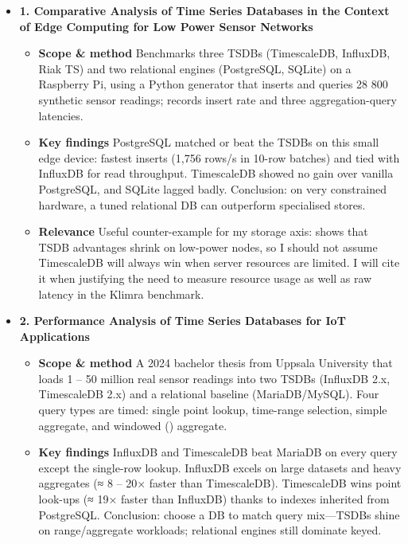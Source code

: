 \documentclass[11pt]{article}
\begin{document}
\begin{itemize}
    \item[] \textbf{1. Comparative Analysis of Time Series Databases in the Context of Edge Computing for Low Power Sensor Networks}
    \begin{itemize}
      \item[] \textbf{Scope \& method}  Benchmarks three TSDBs (TimescaleDB, InfluxDB, Riak TS) and two relational engines (PostgreSQL, SQLite) on a Raspberry Pi, using a Python generator that inserts and queries 28 800 synthetic sensor readings; records insert rate and three aggregation-query latencies.
      
      \item[] \textbf{Key findings}  PostgreSQL matched or beat the TSDBs on this small edge device: fastest inserts (1,756 rows/s in 10-row batches) and tied with InfluxDB for read throughput.  TimescaleDB showed no gain over vanilla PostgreSQL, and SQLite lagged badly.  Conclusion: on very constrained hardware, a tuned relational DB can outperform specialised stores.
      
      \item[] \textbf{Relevance}  Useful counter-example for my storage axis: shows that TSDB advantages shrink on low-power nodes, so I should not assume TimescaleDB will always win when server resources are limited.  I will cite it when justifying the need to measure resource usage as well as raw latency in the Klimra benchmark.
  \end{itemize}
    \item[] \textbf{2. Performance Analysis of Time Series Databases for IoT Applications}
    \begin{itemize}
        \item[] \textbf{Scope \& method} A 2024 bachelor thesis from Uppsala University that loads 1 – 50 million real sensor readings into two TSDBs (InfluxDB 2.x, TimescaleDB 2.x) and a relational baseline (MariaDB/MySQL). Four query types are timed: single point lookup, time-range selection, simple aggregate, and windowed () aggregate.
      
        \item[] \textbf{Key findings} InfluxDB and TimescaleDB beat MariaDB on every query except the single-row lookup. InfluxDB excels on large datasets and heavy aggregates (≈ 8 – 20× faster than TimescaleDB). TimescaleDB wins point look-ups (≈ 19× faster than InfluxDB) thanks to indexes inherited from PostgreSQL. Conclusion: choose a DB to match query mix—TSDBs shine on range/aggregate workloads; relational engines still dominate keyed.
      

\end{itemize}
\end{itemize}
\end{document}

